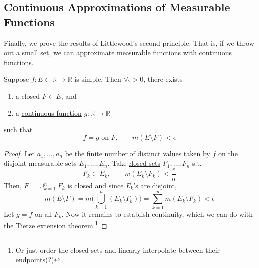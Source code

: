 \subsection{Continuous Approximations of Measurable Functions}

  Finally, we prove the results of Littlewood's second principle. That is, if we throw out a small set, we can approximate \hyperref[def:measurable-function]{measurable functions} with \hyperref[pst-def:continuous_func]{continuous functions}. 

  \begin{lemma}
    \label{thm:luzin-for-simple-functions}
    Suppose $f: E \subset \mathbb{R} \to \mathbb{R}$ is simple. Then $\forall \epsilon > 0$, there exists 
    \begin{enumerate}
      \item a closed $F \subset E$, and 
      \item a \hyperref[pst-def:continuous_func]{continuous function} $g: \mathbb{R} \to \mathbb{R}$
    \end{enumerate}
    such that
    \begin{equation}
      f = g \text{ on } F, \qquad m(E \setminus F) < \epsilon
    \end{equation}
  \end{lemma}
  \begin{proof}
    Let $a_1, \ldots, a_n$ be the finite number of distinct values taken by $f$ on the disjoint measurable sets $E_1, \ldots, E_n$. Take \hyperref[pst-def:closed]{closed sets} $F_1, \ldots, F_n$ s.t. 
    \begin{equation}
      F_k \subset E_k, \qquad m(E_k \setminus F_k) < \frac{\epsilon}{n}
    \end{equation}
    Then, $F = \cup_{k=1}^n F_k$ is closed and since $E_k$'s are disjoint, 
    \begin{equation}
      m(E \setminus F) = m \bigg( \bigcup_{k=1}^n (E_k \setminus F_k) \bigg) = \sum_{k=1}^n m(E_k \setminus F_k) < \epsilon
    \end{equation}
    Let $g = f$ on all $F_k$. Now it remains to establish continuity, which we can do with the \hyperref[pst-thm:tietze-extension-theorem]{Tietze extension theorem}.\footnote{Or just order the closed sets and linearly interpolate between their endpoints(?)}
  \end{proof}

